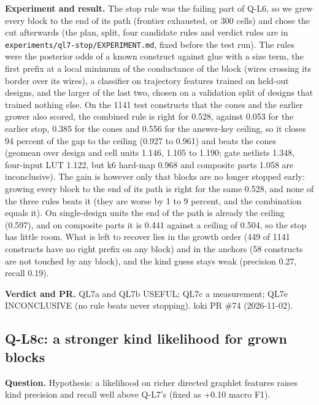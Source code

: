 \documentclass[conference]{IEEEtran}
\newcommand{\hev}[1]{\par\smallskip\noindent\textbf{#1}}
\newcommand{\code}[1]{\texttt{#1}}
\begin{document}
\hev{Experiment and result.} The stop rule was the failing part of Q-L6, so we grew every block to the end of its path (frontier exhausted, or 300 cells)
and chose the cut afterwards (the plan, split, four candidate rules and verdict rules are in \code{experiments/ql7-stop/EXPERIMENT.md}, fixed before the test run). The rules were
the posterior odds of a known construct against glue with a size term, the first prefix at a local minimum of the conductance of the block (wires
crossing its border over its wires), a classifier on trajectory features trained on held-out designs, and the larger of the last two, chosen on a validation split of
designs that trained nothing else. On the 1141 test constructs that the cones and the earlier grower also scored, the combined rule is right for 0.528, against 0.053 for the
earlier stop, 0.385 for the cones and 0.556 for the answer-key ceiling, so it closes 94 percent of the gap to the ceiling (0.927 to 0.961) and beats the cones (geomean
over design and cell units 1.146, 1.105 to 1.190; gate netlists 1.348, four-input LUT 1.122, but k6 hard-map 0.968 and composite parts 1.058 are inconclusive). The gain is
however only that blocks are no longer stopped early: growing every block to the end of its path is right for the same 0.528, and none of the three rules beats it (they are
worse by 1 to 9 percent, and the combination equals it). On single-design units the end of the path is already the ceiling (0.597), and on composite parts it is 0.441
against a ceiling of 0.504, so the stop has little room. What is left to recover lies in the growth order (449 of 1141 constructs have no right prefix on any block) and in the
anchors (58 constructs are not touched by any block), and the kind guess stays weak (precision 0.27, recall 0.19).

\hev{Verdict and PR.} QL7a and QL7b USEFUL; QL7c a measurement; QL7e INCONCLUSIVE (no rule beats never stopping). loki PR \#74 (2026-11-02).

\subsection{Q-L8c: a stronger kind likelihood for grown blocks}
\label{rec:ql8c}

\hev{Question.} Hypothesis: a likelihood on richer directed graphlet features raises kind precision and recall well above Q-L7's (fixed as +0.10 macro F1).
\end{document}
